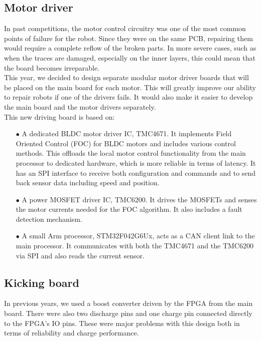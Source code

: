 \documentclass[runningheads]{llncs}
\begin{document}
\subsection{Motor driver}
In past competitions, the motor control circuitry was one of the most common points of failure for the robot. Since they were on the same PCB, repairing them would require a complete reflow of the broken parts. In more severe cases, such as when the traces are damaged, especially on the inner layers, this could mean that the board becomes irreparable.\\
This year, we decided to design separate modular motor driver boards that will be placed on the main board for each motor. This will greatly improve our ability to repair robots if one of the drivers fails. It would also make it easier to develop the main board and the motor drivers separately.\\
This new driving board is based on:
\begin{enumerate}
    \item[$\bullet$] A dedicated BLDC motor driver IC, TMC4671. It implements Field Oriented Control (FOC) for BLDC motors and includes various control methods. This offloads the local motor control functionality from the main processor to dedicated hardware, which is more reliable in terms of latency. It has an SPI interface to receive both configuration and commands and to send back sensor data including speed and position.
    \item[$\bullet$] A power MOSFET driver IC, TMC6200. It drives the MOSFETs and senses the motor currents needed for the FOC algorithm. It also includes a fault detection mechanism.
    \item[$\bullet$] A small Arm processor, STM32F042G6Ux, acts as a CAN client link to the main processor. It communicates with both the TMC4671 and the TMC6200 via SPI and also reads the current sensor.
\end{enumerate}

\subsection{Kicking board}
In previous years, we used a boost converter driven by the FPGA from the main board. There were also two discharge pins and one charge pin connected directly to the FPGA's IO pins. These were major problems with this design both in terms of reliability and charge performance.\\
\end{document}
